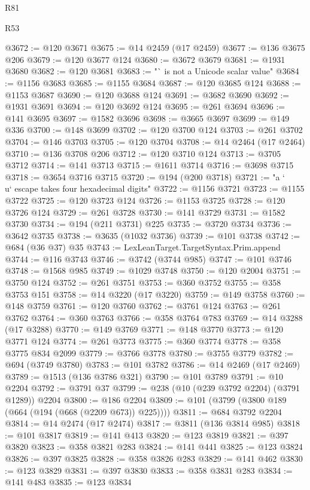 \begin{lexlean}{R81}
\begin{lexlean}{R53}
\begin{coremodule}
{{{{{{{{{{{{{{{{{{{{{{{{{{{{{{{{{{{{{{{{{{{{{{{{{{{{{{{{{{{{{{{{{{{{{{{{{{{{{{{{{{{{{{{{{{{{{{{{{{{{{{{{{{{{{{{{@3672 := @120 @3671
@3675 := @14 @2459 (@17 @2459)
@3677 := @136 @3675 @206
@3679 := @120 @3677 @124
@3680 := @3672 @3679
@3681 := @1931 @3680
@3682 := @120 @3681
@3683 := "` is not a Unicode scalar value"
@3684 := @1156 @3683
@3685 := @1155 @3684
@3687 := @120 @3685 @124
@3688 := @1153 @3687
@3690 := @120 @3688 @124
@3691 := @3682 @3690
@3692 := @1931 @3691
@3694 := @120 @3692 @124
@3695 := @261 @3694
@3696 := @141 @3695
@3697 := @1582 @3696
@3698 := @3665 @3697
@3699 := @149 @336
@3700 := @148 @3699
@3702 := @120 @3700 @124
@3703 := @261 @3702
@3704 := @146 @3703
@3705 := @120 @3704
@3708 := @14 @2464 (@17 @2464)
@3710 := @136 @3708 @206
@3712 := @120 @3710 @124
@3713 := @3705 @3712
@3714 := @141 @3713
@3715 := @1611 @3714
@3716 := @3698 @3715
@3718 := @3654 @3716 @3715
@3720 := @194 (@200 @3718)
@3721 := "a `\\u` escape takes four hexadecimal digits"
@3722 := @1156 @3721
@3723 := @1155 @3722
@3725 := @120 @3723 @124
@3726 := @1153 @3725
@3728 := @120 @3726 @124
@3729 := @261 @3728
@3730 := @141 @3729
@3731 := @1582 @3730
@3734 := @194 (@211 @3731) @225
@3735 := @3720 @3734
@3736 := @3642 @3735
@3738 := @3635 (@1032 @3736)
@3739 := @101 @3738
@3742 := @684 (@36 @37) @35
@3743 := LexLeanTarget.TargetSyntax.Prim.append
@3744 := @116 @3743
@3746 := @3742 (@3744 @985)
@3747 := @101 @3746
@3748 := @1568 @985
@3749 := @1029 @3748
@3750 := @120 @2004
@3751 := @3750 @124
@3752 := @261 @3751
@3753 := @360 @3752
@3755 := @358 @3753 @151
@3758 := @14 @3220 (@17 @3220)
@3759 := @149 @3758
@3760 := @148 @3759
@3761 := @120 @3760
@3762 := @3761 @124
@3763 := @261 @3762
@3764 := @360 @3763
@3766 := @358 @3764 @783
@3769 := @14 @3288 (@17 @3288)
@3770 := @149 @3769
@3771 := @148 @3770
@3773 := @120 @3771 @124
@3774 := @261 @3773
@3775 := @360 @3774
@3778 := @358 @3775 @834 @2099
@3779 := @3766 @3778
@3780 := @3755 @3779
@3782 := @694 (@3749 @3780)
@3783 := @101 @3782
@3786 := @14 @2469 (@17 @2469)
@3789 := @1513 (@136 @3786 @321)
@3790 := @101 @3789
@3791 := @10 @2204
@3792 := @3791 @37
@3799 := @238 (@10 (@239 @3792 @2204) (@3791 @1289)) @2204
@3800 := @186 @2204
@3809 := @101 (@3799 (@3800 @189 (@664 (@194 (@668 (@2209 @673)) @225))))
@3811 := @684 @3792 @2204
@3814 := @14 @2474 (@17 @2474)
@3817 := @3811 (@136 @3814 @985)
@3818 := @101 @3817
@3819 := @141 @413
@3820 := @123 @3819
@3821 := @397 @3820
@3823 := @358 @3821 @283
@3824 := @141 @441
@3825 := @123 @3824
@3826 := @397 @3825
@3828 := @358 @3826 @283
@3829 := @141 @462
@3830 := @123 @3829
@3831 := @397 @3830
@3833 := @358 @3831 @283
@3834 := @141 @483
@3835 := @123 @3834
}}}}}}}}}}}}}}}}}}}}}}}}}}}}}}}}}}}}}}}}}}}}}}}}}}}}}}}}}}}}}}}}}}}}}}}}}}}}}}}}}}}}}}}}}}}}}}}}}}}}}}}}}}}}}}}}
\end{coremodule}
\end{lexlean}
\end{lexlean}
